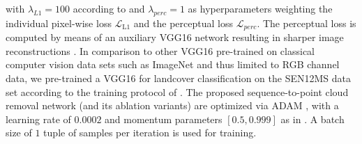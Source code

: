 \documentclass[journal]{IEEEtran}
\begin{document}
with $\lambda_{L1} = 100$ according to \cite{Sarukkai_Jain_Uzkent_Ermon_2019} and $\lambda_{perc} = 1$ as hyperparameters weighting the individual pixel-wise loss $\mathcal{L}_\text{L1}$ and the perceptual loss $\mathcal{L}_{perc}$. The perceptual loss is computed by means of an auxiliary VGG16 network \cite{Simonyan_Zisserman_2014} resulting in sharper image reconstructions \cite{johnson2016perceptual}. In comparison to other VGG16 pre-trained on classical computer vision data sets such as ImageNet \cite{russakovsky2015imagenet} and thus limited to RGB channel data, we pre-trained a VGG16 for landcover classification on the SEN12MS data set \cite{schmitt2019sen12ms} according to the training protocol of \cite{schmitt2021remote}. The proposed sequence-to-point cloud removal network (and its ablation variants) are optimized via ADAM \cite{kingma2014adam}, with a learning rate of $0.0002$ and momentum parameters $\left [ 0.5, 0.999 \right ]$ as in \cite{Sarukkai_Jain_Uzkent_Ermon_2019}. A batch size of $1$ tuple of samples per iteration is used for training.
\end{document}
